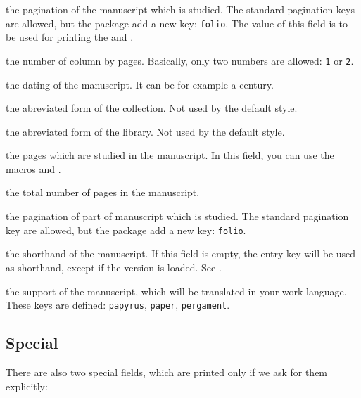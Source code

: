 \documentclass{ltxdockit}[2011/03/25]
\begin{document}
\begin{fieldlist}

 the pagination of the manuscript which is studied. The standard pagination keys are allowed, but the package add a new key: \texttt{folio}. The value of this field is to be used for printing the  and .

 the number of column by pages. Basically, only two numbers are allowed: \verb+1+ or \verb+2+.

 the dating of the manuscript. It can be for example a century.

 the abreviated form of the collection. Not used by the default style.\label{field:shortcollection}


 the abreviated form of the library. Not used by the default style.


 the pages which are studied in the manuscript. In this field, you can use the macros  and .

 the total number of pages in the manuscript.


 the pagination of part of manuscript which is studied. The standard pagination key are allowed, but the package add a new key: \verb+folio+.


 the shorthand of the manuscript. If this field is empty, the entry key will be used as shorthand, except if the version  is loaded. See .

 the support of the manuscript, which will be translated in your work language. These keys are defined: \texttt{papyrus}, \texttt{paper}, \texttt{pergament}.

\end{fieldlist}

\subsection{Special}\label{fields:special}
There are also two special fields, which are printed only if we ask for them explicitly:
\end{document}
